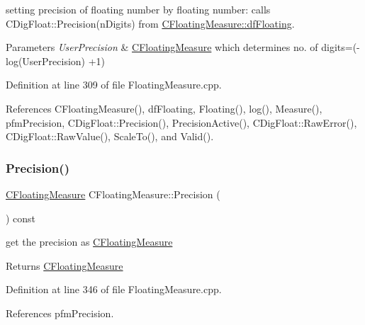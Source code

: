 setting precision of floating number by floating number\+: calls C\+Dig\+Float\+::\+Precision(n\+Digits) from \hyperlink{classCFloatingMeasure_aa0cec9966c6c08db75c493e44396cfc2}{C\+Floating\+Measure\+::df\+Floating}. 


\begin{DoxyParams}{Parameters}
{\em User\+Precision} & \hyperlink{classCFloatingMeasure}{C\+Floating\+Measure} which determines no. of digits=(-\/log(User\+Precision) +1) \\
\hline
\end{DoxyParams}


Definition at line 309 of file Floating\+Measure.\+cpp.



References C\+Floating\+Measure(), df\+Floating, Floating(), log(), Measure(), pfm\+Precision, C\+Dig\+Float\+::\+Precision(), Precision\+Active(), C\+Dig\+Float\+::\+Raw\+Error(), C\+Dig\+Float\+::\+Raw\+Value(), Scale\+To(), and Valid().

\mbox{\label{classCFloatingMeasure_ac8975daf37b98b3e996893e0de43c4eb}} 
\subsubsection{\texorpdfstring{Precision()}{Precision()}\hspace{0.1cm}{\footnotesize\ttfamily [2/2]}}
{\footnotesize\ttfamily \hyperlink{classCFloatingMeasure}{C\+Floating\+Measure} C\+Floating\+Measure\+::\+Precision (\begin{DoxyParamCaption}{ }\end{DoxyParamCaption}) const}



get the precision as \hyperlink{classCFloatingMeasure}{C\+Floating\+Measure} 

\begin{DoxyReturn}{Returns}
\hyperlink{classCFloatingMeasure}{C\+Floating\+Measure} 
\end{DoxyReturn}


Definition at line 346 of file Floating\+Measure.\+cpp.



References pfm\+Precision.

\mbox{\label{classCFloatingMeasure_a4fe4d60589da6d4c7f09cb09fbea730b}} 
